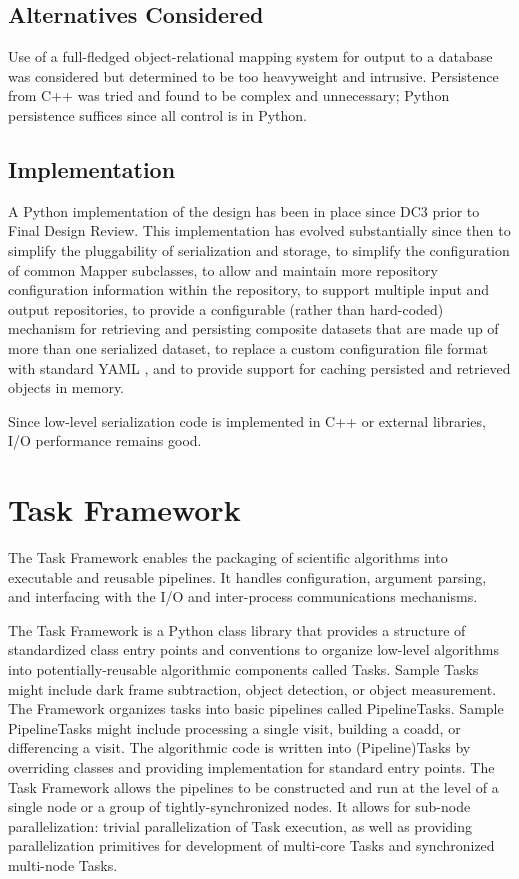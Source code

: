 \documentclass[DM,lsstdraft,toc]{lsstdoc}
\begin{document}
\subsection{Alternatives Considered}\label{alternatives-considered}

Use of a full-fledged object-relational mapping system for output to a
database was considered but determined to be too heavyweight and
intrusive. Persistence from C++ was tried and found to be complex and
unnecessary; Python persistence suffices since all control is in Python.

\subsection{Implementation}\label{butler-implementation}

A Python implementation of the design has been in place since DC3 prior to
Final Design Review.  This implementation has evolved substantially since then
to simplify the pluggability of serialization and storage, to simplify the
configuration of common Mapper subclasses, to allow and maintain more
repository configuration information within the repository, to support multiple
input and output repositories, to provide a configurable (rather than
hard-coded) mechanism for retrieving and persisting composite datasets that are
made up of more than one serialized dataset, to replace a custom configuration
file format with standard YAML \citep{YAML}, and to provide support for caching
persisted and retrieved objects in memory.

Since low-level serialization code is implemented in C++ or external libraries,
I/O performance remains good.


\section{Task Framework}\label{task-framework}

The Task Framework enables the packaging of scientific algorithms into
executable and reusable pipelines. It handles configuration, argument parsing,
and interfacing with the I/O and inter-process communications mechanisms.

The Task Framework is a Python class library that provides a structure of
standardized class entry points and conventions to organize low-level
algorithms into potentially-reusable algorithmic components called Tasks.
Sample Tasks might include dark frame subtraction, object detection, or object
measurement.  The Framework organizes tasks into basic pipelines called
PipelineTasks.  Sample PipelineTasks might include processing a single visit,
building a coadd, or differencing a visit. The algorithmic code is written into
(Pipeline)Tasks by overriding classes and providing implementation for standard
entry points. The Task Framework allows the pipelines to be constructed and run
at the level of a single node or a group of tightly-synchronized nodes. It
allows for sub-node parallelization: trivial parallelization of Task execution,
as well as providing parallelization primitives for development of multi-core
Tasks and synchronized multi-node Tasks.
\end{document}
